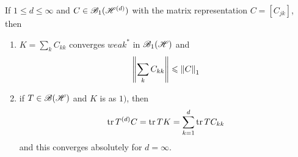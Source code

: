 \documentclass[a4paper,11pt]{report}
\begin{document}
\begin{prop}
	If $1 \leqslant d \leqslant \infty$ and $C \in \mathscr{B}_1(\mathscr{H}^{(d)})$ with the matrix representation $C = [C_{jk}]$, then
	\begin{enumerate}[label = \arabic*)]
		\item $K = \sum_k C_{kk}$ converges $weak^{*}$ in $\mathscr{B}_{1}\mathscr{(H)}$ and
		\begin{equation*}
			\left\lVert\sum_k C_{kk}\right\lVert \leqslant \left\lVert C\right\lVert_1
		\end{equation*}
		\item if $T \in \mathscr{B(H)}$ and $K$ is as $1)$, then
		\begin{equation*}
			\operatorname{tr}{T^{(d)}C} = \operatorname{tr}{TK} = \sum_{k=1}^{d} \operatorname{tr}{TC_{kk}}
		\end{equation*}
		and this converges absolutely for $d = \infty$.
	\end{enumerate}
\end{prop}
\end{document}
